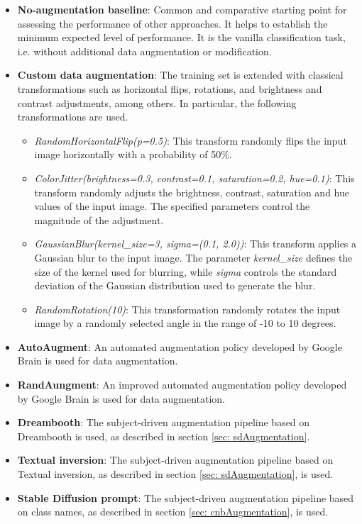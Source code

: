 \begin{itemize}
    \item \textbf{No-augmentation baseline}: Common and comparative starting point for assessing the performance of other approaches. It helps to establish the minimum expected level of performance. It is the vanilla classification task, i.e. without additional data augmentation or modification.
    \item \textbf{Custom data augmentation}: The training set is extended with classical transformations such as horizontal flips, rotations, and brightness and contrast adjustments, among others. In particular, the following transformations are used.
    \begin{itemize}
        \item \textit{RandomHorizontalFlip(p=0.5)}: This transform randomly flips the input image horizontally with a probability of 50\%.
        \item \textit{ColorJitter(brightness=0.3, contrast=0.1, saturation=0.2, hue=0.1)}: This transform randomly adjusts the brightness, contrast, saturation and hue values of the input image. The specified parameters control the magnitude of the adjustment.
        \item \textit{GaussianBlur(kernel\_size=3, sigma=(0.1, 2.0))}: This transform applies a Gaussian blur to the input image. The parameter \textit{kernel\_size} defines the size of the kernel used for blurring, while \textit{sigma} controls the standard deviation of the Gaussian distribution used to generate the blur.
        \item \textit{RandomRotation(10)}: This transformation randomly rotates the input image by a randomly selected angle in the range of -10 to 10 degrees.
    \end{itemize}
    \item \textbf{AutoAugment}: An automated augmentation policy developed by Google Brain \cite{cubuk2018autoaugment} is used for data augmentation.
    \item \textbf{RandAungment}: An improved automated augmentation policy developed by Google Brain \cite{cubuk2020randaugment} is used for data augmentation.
    \item \textbf{Dreambooth}: The subject-driven augmentation pipeline based on Dreambooth is used, as described in section \ref{sec: sdAugmentation}. 
    \item \textbf{Textual inversion}: The subject-driven augmentation pipeline based on Textual inversion, as described in section \ref{sec: sdAugmentation}, is used.
    \item \textbf{Stable Diffusion prompt}: The subject-driven augmentation pipeline based on class names, as described in section \ref{sec: cnbAugmentation}, is used.
\end{itemize}

